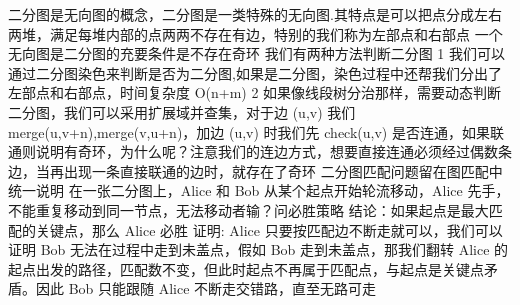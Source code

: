 {}
\markdownRendererSectionEnd 
\markdownRendererSectionEnd 
\markdownRendererSectionEnd 
\markdownRendererSectionEnd \markdownRendererSectionBegin
{}\markdownRendererInterblockSeparator
{}二分图是无向图的概念，二分图是一类特殊的无向图.其特点是可以把点分成左右两堆，满足每堆内部的点两两不存在有边，特别的我们称为左部点和右部点\markdownRendererInterblockSeparator
{}\markdownRendererSectionBegin
{}\markdownRendererInterblockSeparator
{}一个无向图是二分图的充要条件是不存在奇环 我们有两种方法判断二分图\markdownRendererParagraphSeparator
{}\markdownRendererDollarSign{} 1 \markdownRendererDollarSign{}我们可以通过二分图染色来判断是否为二分图,如果是二分图，染色过程中还帮我们分出了左部点和右部点，时间复杂度\markdownRendererDollarSign{} O(n+m) \markdownRendererDollarSign{}\markdownRendererParagraphSeparator
{}\markdownRendererDollarSign{} 2 \markdownRendererDollarSign{}如果像线段树分治那样，需要动态判断二分图，我们可以采用扩展域并查集，对于边 \markdownRendererDollarSign{}(u,v)\markdownRendererDollarSign{} 我们 \markdownRendererDollarSign{}merge(u,v+n),merge(v,u+n)\markdownRendererDollarSign{}，加边 \markdownRendererDollarSign{}(u,v)\markdownRendererDollarSign{} 时我们先 \markdownRendererDollarSign{}check(u,v)\markdownRendererDollarSign{} 是否连通，如果联通则说明有奇环，为什么呢？注意我们的连边方式，想要直接连通必须经过偶数条边，当再出现一条直接联通的边时，就存在了奇环\markdownRendererInterblockSeparator
{}\markdownRendererSectionBegin
{}\markdownRendererInterblockSeparator
{}\markdownRendererInterblockSeparator
{}二分图匹配问题留在图匹配中统一说明\markdownRendererInterblockSeparator
{}
\markdownRendererSectionEnd 
\markdownRendererSectionEnd \markdownRendererSectionBegin
{}\markdownRendererInterblockSeparator
{}在一张二分图上，\markdownRendererDollarSign{}Alice\markdownRendererDollarSign{} 和 \markdownRendererDollarSign{}Bob\markdownRendererDollarSign{} 从某个起点开始轮流移动，\markdownRendererDollarSign{}Alice\markdownRendererDollarSign{} 先手，不能重复移动到同一节点，无法移动者输？问必胜策略\markdownRendererParagraphSeparator
{}结论：如果起点是最大匹配的关键点，那么 \markdownRendererDollarSign{}Alice\markdownRendererDollarSign{} 必胜\markdownRendererParagraphSeparator
{}证明: \markdownRendererDollarSign{}Alice\markdownRendererDollarSign{} 只要按匹配边不断走就可以，我们可以证明 \markdownRendererDollarSign{}Bob\markdownRendererDollarSign{} 无法在过程中走到未盖点，假如 \markdownRendererDollarSign{}Bob\markdownRendererDollarSign{} 走到未盖点，那我们翻转 \markdownRendererDollarSign{}Alice\markdownRendererDollarSign{} 的起点出发的路径，匹配数不变，但此时起点不再属于匹配点，与起点是关键点矛盾。因此 \markdownRendererDollarSign{}Bob\markdownRendererDollarSign{} 只能跟随 \markdownRendererDollarSign{}Alice\markdownRendererDollarSign{} 不断走交错路，直至无路可走\markdownRendererParagraphSeparator
